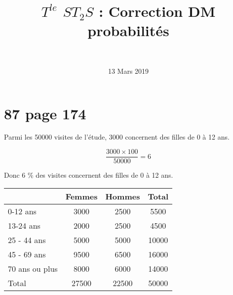 \documentclass[a4paper,11pt]{exam}
\author{\ }
\date{13 Mars 2019}
\title{$T^{le}$ $ST_2S$ : Correction DM probabilités}
\begin{document}
	
\section{87 page 174}

\begin{questions}
	\question Parmi les \num{50000} visites de l'étude, \num{3000} concernent des filles de 0 à 12 ans.
	
	\begin{equation*}
		\frac{\num{3000} \times 100}{\num{50000}} = 6
	\end{equation*}
	
	Donc 6 \% des visites concernent des filles de 0 à 12 ans.
	
	\question 
	
	\begin{tabular}{|l|c|c|c|}
		\hline
		& Femmes      & Hommes      & Total       \\ \hline
		0-12 ans       & \num{3000}  & \num{2500}  & \num{5500}  \\ \hline
		13-24 ans      & \num{2000}  & \num{2500}  & \num{4500}  \\ \hline
		25 - 44 ans    & \num{5000}  & \num{5000}  & \num{10000} \\ \hline
		45 - 69 ans    & \num{9500}  & \num{6500}  & \num{16000} \\ \hline
		70 ans ou plus & \num{8000}  & \num{6000}  & \num{14000} \\ \hline
		Total          & \num{27500} & \num{22500} & \num{50000} \\ \hline
	\end{tabular}

	\question
\end{questions}
\end{document}
